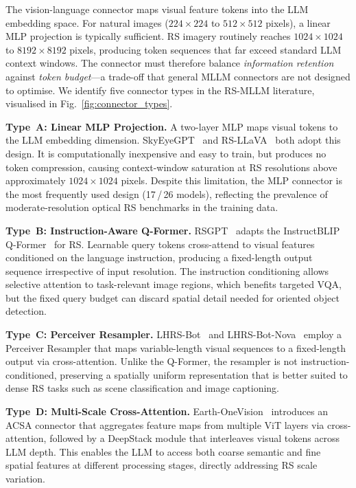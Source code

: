 The vision-language connector maps visual feature tokens into the LLM embedding space.
For natural images ($224\!\times\!224$ to $512\!\times\!512$ pixels), a linear MLP
projection is typically sufficient. RS imagery routinely reaches
$1024\!\times\!1024$ to $8192\!\times\!8192$ pixels, producing token sequences that
far exceed standard LLM context windows. The connector must therefore balance
\emph{information retention} against \emph{token budget}---a trade-off that general
MLLM connectors are not designed to optimise. We identify five connector types in the
RS-MLLM literature, visualised in Fig.~\ref{fig:connector_types}.

\textbf{Type~A: Linear MLP Projection.}
A two-layer MLP maps visual tokens to the LLM embedding dimension. SkyEyeGPT~\cite{skyeyegpt2025}
and RS-LLaVA~\cite{rsllava2024} both adopt this design. It is computationally inexpensive
and easy to train, but produces no token compression, causing context-window saturation
at RS resolutions above approximately $1024\!\times\!1024$ pixels. Despite this
limitation, the MLP connector is the most frequently used design (17\,/\,26 models),
reflecting the prevalence of moderate-resolution optical RS benchmarks in the training data.

\textbf{Type~B: Instruction-Aware Q-Former.}
RSGPT~\cite{rsgpt2023} adapts the InstructBLIP Q-Former~\cite{instructblip2023} for RS.
Learnable query tokens cross-attend to visual features conditioned on the language
instruction, producing a fixed-length output sequence irrespective of input resolution.
The instruction conditioning allows selective attention to task-relevant image regions,
which benefits targeted VQA, but the fixed query budget can discard spatial detail
needed for oriented object detection.

\textbf{Type~C: Perceiver Resampler.}
LHRS-Bot~\cite{lhrsbot2024} and LHRS-Bot-Nova~\cite{lhrsbotnova2024} employ a Perceiver
Resampler that maps variable-length visual sequences to a fixed-length output via
cross-attention. Unlike the Q-Former, the resampler is not instruction-conditioned,
preserving a spatially uniform representation that is better suited to dense RS tasks
such as scene classification and image captioning.

\textbf{Type~D: Multi-Scale Cross-Attention.}
Earth-OneVision~\cite{earthonevision2026} introduces an ACSA connector that aggregates
feature maps from multiple ViT layers via cross-attention, followed by a DeepStack module
that interleaves visual tokens across LLM depth. This enables the LLM to access both
coarse semantic and fine spatial features at different processing stages, directly
addressing RS scale variation.

